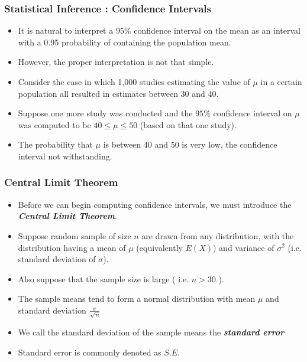\documentclass[a4]{beamer}
\begin{document}
\begin{frame}
\frametitle{Statistical Inference : Confidence Intervals}
\begin{itemize}

\item It is natural to interpret a $95\%$ confidence interval on the mean as an interval with a 0.95 probability of containing the population mean.
\item However, the proper interpretation is not that simple.
\item Consider the case in which 1,000 studies estimating the value of $\mu$  in a certain population all resulted
in estimates between 30 and 40.
\item Suppose one more study was conducted and the $95\%$ confidence interval on $\mu$ was computed
to be $40 \leq \mu \leq 50$ (based on that one study).

\item The probability that $\mu$ is between 40 and 50 is very low, the confidence interval not withstanding.

\end{itemize}
\end{frame}

\begin{frame}
\frametitle{Central Limit Theorem}

\begin{itemize}

\item Before we can begin computing confidence intervals, we must introduce the \textbf{\emph{Central Limit Theorem}}.

\item Suppose random sample of size $n$ are drawn from any distribution, with the distribution having a mean of $\mu$ (equivalently $E(X)$) and variance of $\sigma^2$ (i.e. standard deviation of $\sigma$).

\item Also suppose that the sample size is large ( i.e. $n > 30$ ).

\item The sample means tend to form a normal distribution with mean $\mu$ and standard deviation $ { \sigma \over \sqrt{n} }$

\item We call the standard deviation of the sample means the \textbf{\emph{standard error}}
\item Standard error is commonly denoted as $S.E.$
\end{itemize}
\end{frame}
\end{document}
